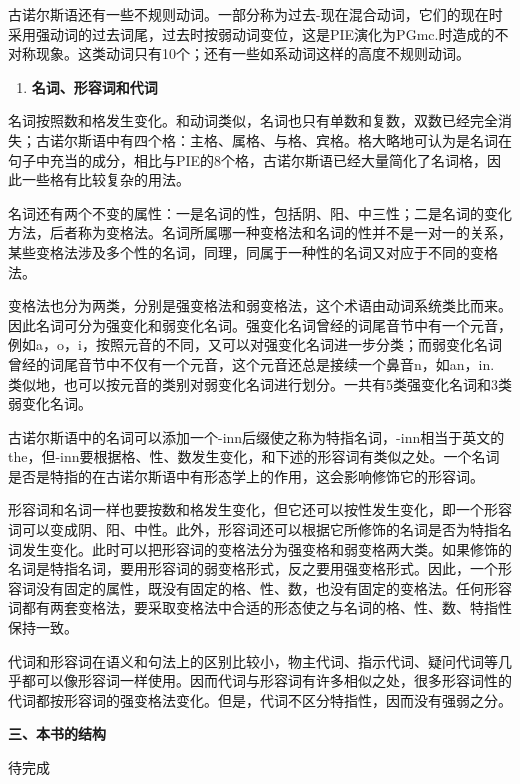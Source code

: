 古诺尔斯语还有一些不规则动词。一部分称为过去-现在混合动词，它们的现在时采用强动词的过去词尾，过去时按弱动词变位，这是PIE演化为PGmc.时造成的不对称现象。这类动词只有10个；还有一些如系动词这样的高度不规则动词。

\begin{enumerate}
  \def\labelenumi{\Alph{enumi}.}
  \setcounter{enumi}{2}
  \item
        \textbf{名词、形容词和代词}
\end{enumerate}

名词按照数和格发生变化。和动词类似，名词也只有单数和复数，双数已经完全消失；古诺尔斯语中有四个格：主格、属格、与格、宾格。格大略地可认为是名词在句子中充当的成分，相比与PIE的8个格，古诺尔斯语已经大量简化了名词格，因此一些格有比较复杂的用法。

名词还有两个不变的属性：一是名词的性，包括阴、阳、中三性；二是名词的变化方法，后者称为变格法。名词所属哪一种变格法和名词的性并不是一对一的关系，某些变格法涉及多个性的名词，同理，同属于一种性的名词又对应于不同的变格法。

变格法也分为两类，分别是强变格法和弱变格法，这个术语由动词系统类比而来。因此名词可分为强变化和弱变化名词。强变化名词曾经的词尾音节中有一个元音，例如a，o，i，按照元音的不同，又可以对强变化名词进一步分类；而弱变化名词曾经的词尾音节中不仅有一个元音，这个元音还总是接续一个鼻音n，如an，in.
类似地，也可以按元音的类别对弱变化名词进行划分。一共有5类强变化名词和3类弱变化名词。

古诺尔斯语中的名词可以添加一个-inn后缀使之称为特指名词，-inn相当于英文的the，但-inn要根据格、性、数发生变化，和下述的形容词有类似之处。一个名词是否是特指的在古诺尔斯语中有形态学上的作用，这会影响修饰它的形容词。

形容词和名词一样也要按数和格发生变化，但它还可以按性发生变化，即一个形容词可以变成阴、阳、中性。此外，形容词还可以根据它所修饰的名词是否为特指名词发生变化。此时可以把形容词的变格法分为强变格和弱变格两大类。如果修饰的名词是特指名词，要用形容词的弱变格形式，反之要用强变格形式。因此，一个形容词没有固定的属性，既没有固定的格、性、数，也没有固定的变格法。任何形容词都有两套变格法，要采取变格法中合适的形态使之与名词的格、性、数、特指性保持一致。

代词和形容词在语义和句法上的区别比较小，物主代词、指示代词、疑问代词等几乎都可以像形容词一样使用。因而代词与形容词有许多相似之处，很多形容词性的代词都按形容词的强变格法变化。但是，代词不区分特指性，因而没有强弱之分。

\textbf{三、本书的结构}

待完成

